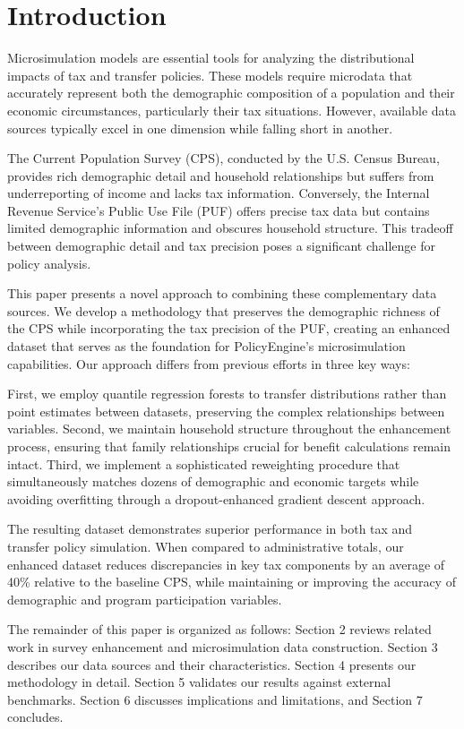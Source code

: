 \section{Introduction}

Microsimulation models are essential tools for analyzing the distributional impacts of tax and transfer policies. These models require microdata that accurately represent both the demographic composition of a population and their economic circumstances, particularly their tax situations. However, available data sources typically excel in one dimension while falling short in another.

The Current Population Survey (CPS), conducted by the U.S. Census Bureau, provides rich demographic detail and household relationships but suffers from underreporting of income and lacks tax information. Conversely, the Internal Revenue Service's Public Use File (PUF) offers precise tax data but contains limited demographic information and obscures household structure. This tradeoff between demographic detail and tax precision poses a significant challenge for policy analysis.

This paper presents a novel approach to combining these complementary data sources. We develop a methodology that preserves the demographic richness of the CPS while incorporating the tax precision of the PUF, creating an enhanced dataset that serves as the foundation for PolicyEngine's microsimulation capabilities. Our approach differs from previous efforts in three key ways:

First, we employ quantile regression forests to transfer distributions rather than point estimates between datasets, preserving the complex relationships between variables. Second, we maintain household structure throughout the enhancement process, ensuring that family relationships crucial for benefit calculations remain intact. Third, we implement a sophisticated reweighting procedure that simultaneously matches dozens of demographic and economic targets while avoiding overfitting through a dropout-enhanced gradient descent approach.

The resulting dataset demonstrates superior performance in both tax and transfer policy simulation. When compared to administrative totals, our enhanced dataset reduces discrepancies in key tax components by an average of 40\% relative to the baseline CPS, while maintaining or improving the accuracy of demographic and program participation variables.

The remainder of this paper is organized as follows: Section 2 reviews related work in survey enhancement and microsimulation data construction. Section 3 describes our data sources and their characteristics. Section 4 presents our methodology in detail. Section 5 validates our results against external benchmarks. Section 6 discusses implications and limitations, and Section 7 concludes.

